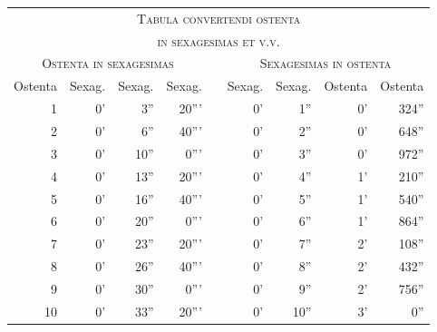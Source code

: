 %
\begin{tabnums} %
\normalsize
\centering
\setlength{\tabcolsep}{3pt}
\renewcommand{\arraystretch}{1.1}
\newcommand{\colhead}[1]{\multicolumn{1}{c}{\footnotesize #1}}
%
\begin{tabular}{@{} r r r r  c r r r r }
\toprule
  \multicolumn{9}{c}{\Large\scshape Tabula convertendi ostenta} \\
  \multicolumn{9}{c}{\Large\scshape in sexagesimas et v.v.} \\
\toprule
  \multicolumn{4}{c}{\normalsize\scshape Ostenta in sexagesimas} & &
  \multicolumn{4}{c}{\normalsize\scshape Sexagesimas in ostenta}
\\
\cmidrule[\heavyrulewidth]{1-4} \cmidrule[\heavyrulewidth]{6-9}
\colhead{Ostenta} &
\colhead{Sexag.} &
\colhead{Sexag.} &
\colhead{Sexag.} &
\hspace{8mm} &
\colhead{Sexag.} &
\colhead{Sexag.} &
\colhead{Ostenta} &
\colhead{Ostenta}
\\
\cmidrule{1-4} \cmidrule{6-9}
   1 &  0' &  3'' & 20''' & &  0' &  1'' &    0' & 324'' \\
   2 &  0' &  6'' & 40''' & &  0' &  2'' &    0' & 648'' \\
   3 &  0' & 10'' &  0''' & &  0' &  3'' &    0' & 972'' \\
   4 &  0' & 13'' & 20''' & &  0' &  4'' &    1' & 210'' \\
   5 &  0' & 16'' & 40''' & &  0' &  5'' &    1' & 540'' \\
   6 &  0' & 20'' &  0''' & &  0' &  6'' &    1' & 864'' \\
   7 &  0' & 23'' & 20''' & &  0' &  7'' &    2' & 108'' \\
   8 &  0' & 26'' & 40''' & &  0' &  8'' &    2' & 432'' \\
   9 &  0' & 30'' &  0''' & &  0' &  9'' &    2' & 756'' \\
  10 &  0' & 33'' & 20''' & &  0' & 10'' &    3' &   0'' \\

\end{tabular}
\end{tabnums}
